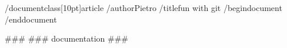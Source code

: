 /documentclass[10pt]{article}
/author{Pietro}
/title{fun with git}
/begin{document}
/end{document}

###
### documentation
###


